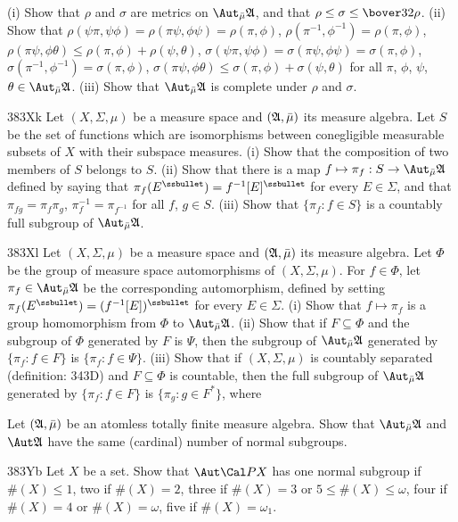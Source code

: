 {\noindent(i) Show that $\rho$ and $\sigma$ are metrics on $\AmuA$, and that
$\rho\le\sigma\le\bover32\rho$.      (ii) Show that
$\rho(\psi\pi,\psi\phi)=\rho(\pi\psi,\phi\psi)=\rho(\pi,\phi)$, 
$\rho(\pi^{-1},\phi^{-1})=\rho(\pi,\phi)$,
$\rho(\pi\psi,\phi\theta)\le\rho(\pi,\phi)+\rho(\psi,\theta)$,
$\sigma(\psi\pi,\psi\phi)=\sigma(\pi\psi,\phi\psi)=\sigma(\pi,\phi)$,
$\sigma(\pi^{-1},\phi^{-1})=\sigma(\pi,\phi)$,
$\sigma(\pi\psi,\phi\theta)\le\sigma(\pi,\phi)+\sigma(\psi,\theta)$
for all $\pi$, $\phi$, $\psi$, $\theta\in\AmuA$.   
(iii) Show that $\AmuA$ is complete
under $\rho$ and $\sigma$.

\spheader 383Xk Let $(X,\Sigma,\mu)$ be a measure space and 
$(\frak A,\bar\mu)$ its measure algebra.   Let $S$ be the set of functions
which are isomorphisms between conegligible measurable
subsets of $X$ with their
subspace measures.   (i) Show that the composition of two members of $S$
belongs to $S$.  (ii) Show that there is a map
$f\mapsto\pi_f:S\to\AmuA$ defined by saying that
$\pi_f(E^{\ssbullet})=f^{-1}[E]^{\ssbullet}$ for every $E\in\Sigma$, and
that $\pi_{fg}=\pi_f\pi_g$, $\pi_f^{-1}=\pi_{f^{-1}}$ 
for all $f$, $g\in S$.
(iii) Show that $\{\pi_f:f\in S\}$ is a countably full subgroup of
$\AmuA$.

\sqheader 383Xl Let $(X,\Sigma,\mu)$ be a measure space and
$(\frak A,\bar\mu)$ its measure algebra.   Let $\Phi$ be the group of
measure space automorphisms of $(X,\Sigma,\mu)$.   For $f\in\Phi$,
let $\pi_f\in\AmuA$ be the corresponding automorphism, defined
by setting $\pi_f(E^{\ssbullet})=(f^{-1}[E])^{\ssbullet}$ for every
$E\in\Sigma$.   (i) Show that $f\mapsto\pi_f$ is a group homomorphism from
$\Phi$ to $\AmuA$.   (ii) Show that if $F\subseteq\Phi$ and the subgroup of
$\Phi$ generated by $F$ is $\Psi$, then the subgroup of $\AmuA$ generated
by $\{\pi_f:f\in F\}$ is $\{\pi_f:f\in\Psi\}$.   (iii) Show that if
$(X,\Sigma,\mu)$ is countably separated (definition: 343D) and
$F\subseteq\Phi$ is countable, then the full subgroup of $\AmuA$ generated
by $\{\pi_f:f\in F\}$ is $\{\pi_g:g\in F^*\}$, where


Let $(\frak A,\bar\mu)$ be an
atomless totally finite measure algebra.   Show that $\AmuA$ and
$\Aut\frak A$ have the same (cardinal) number of normal subgroups.

\spheader 383Yb Let $X$ be a set.   Show that $\Aut\Cal PX$ has one
normal subgroup if $\#(X)\le 1$, two if $\#(X)=2$, three if $\#(X)=3$ or
$5\le\#(X)\le\omega$, four if $\#(X)=4$ or $\#(X)=\omega$, five if
$\#(X)=\omega_1$.
}%

